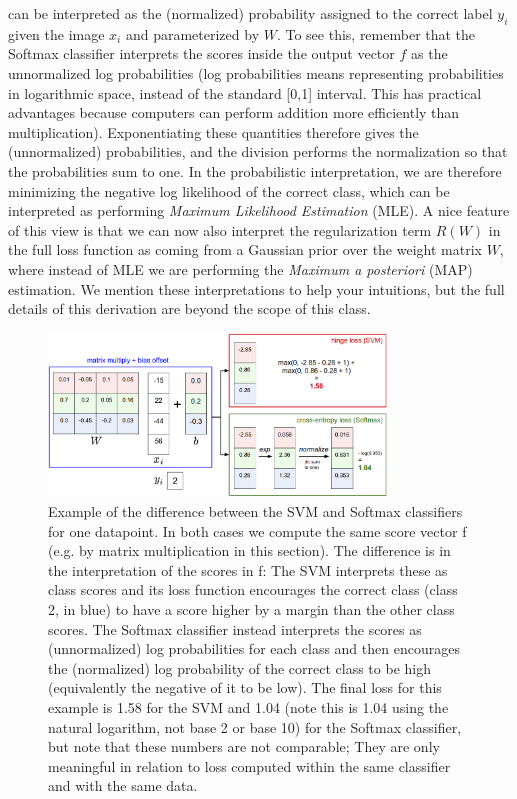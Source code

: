 can be interpreted as the (normalized) probability assigned to the correct label $y_i$ given the image $x_i$ and parameterized by $W$. To see this, remember that the Softmax classifier interprets the scores inside the output vector $f$ as the unnormalized log probabilities (log probabilities means representing probabilities in logarithmic space, instead of the standard [0,1] interval. This has practical advantages because computers can perform addition more efficiently than multiplication). Exponentiating these quantities therefore gives the (unnormalized) probabilities, and the division performs the normalization so that the probabilities sum to one. In the probabilistic interpretation, we are therefore minimizing the negative log likelihood of the correct class, which can be interpreted as performing \textit{Maximum Likelihood Estimation} (MLE). A nice feature of this view is that we can now also interpret the regularization term $R(W)$ in the full loss function as coming from a Gaussian prior over the weight matrix $W$, where instead of MLE we are performing the \textit{Maximum a posteriori} (MAP) estimation. We mention these interpretations to help your intuitions, but the full details of this derivation are beyond the scope of this class.

\begin{figure}[h]
  \centering
  \includegraphics[width=0.8\textwidth]{Images/loss_f/1.png}
  \caption{Example of the difference between the SVM and Softmax classifiers for one datapoint. In both cases we compute the same score vector f (e.g. by matrix multiplication in this section). The difference is in the interpretation of the scores in f: The SVM interprets these as class scores and its loss function encourages the correct class (class 2, in blue) to have a score higher by a margin than the other class scores. The Softmax classifier instead interprets the scores as (unnormalized) log probabilities for each class and then encourages the (normalized) log probability of the correct class to be high (equivalently the negative of it to be low). The final loss for this example is 1.58 for the SVM and 1.04 (note this is 1.04 using the natural logarithm, not base 2 or base 10) for the Softmax classifier, but note that these numbers are not comparable; They are only meaningful in relation to loss computed within the same classifier and with the same data.}
\end{figure}

